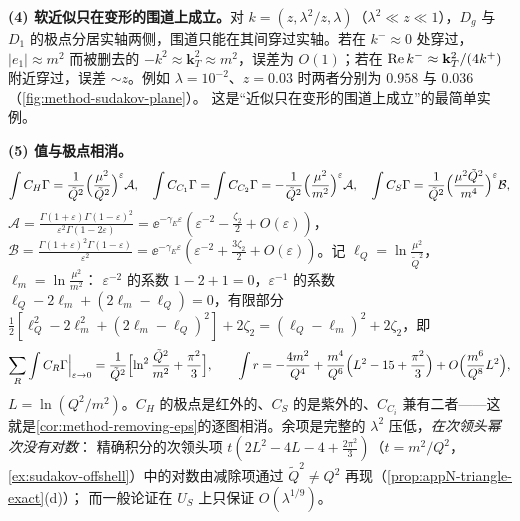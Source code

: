 \begin{example}
\textbf{(4) 软近似只在变形的围道上成立。}对 $k=(z,\lambda^2/z,\lambda)$（$\lambda^2\ll z\ll1$），$D_g$ 与 $D_1$ 的极点分居实轴两侧，围道只能在其间穿过实轴。若在 $k^-\approx0$ 处穿过，$|e_1|\approx m^2$
而被删去的 $-k^2\approx\mathbf k_T^2\approx m^2$，误差为 $O(1)$；若在 $\operatorname{Re} k^-\approx\mathbf k_T^2/(4k^+)$ 附近穿过，误差 $\sim z$。例如 $\lambda=10^{-2}$、$z=0.03$ 时两者分别为 $0.958$ 与 $0.036$
（\cref{fig:method-sudakov-plane}）。%
这是“近似只在变形的围道上成立”的最简单实例。

\textbf{(5) 值与极点相消。}
\begin{equation}\label{eq:method-tri-values}
\int C_H\Gamma=\frac{1}{\tilde Q^2}\Bigl(\frac{\mu^2}{\tilde Q^2}\Bigr)^{\varepsilon}\mathcal A,\quad
\int C_{C_1}\Gamma=\int C_{C_2}\Gamma=-\frac{1}{\tilde Q^2}\Bigl(\frac{\mu^2}{m^2}\Bigr)^{\varepsilon}\mathcal A,\quad
\int C_S\Gamma=\frac{1}{\tilde Q^2}\Bigl(\frac{\mu^2\tilde Q^2}{m^4}\Bigr)^{\varepsilon}\mathcal B,
\end{equation}
$\mathcal A=\frac{\Gamma(1+\varepsilon)\Gamma(1-\varepsilon)^2}{\varepsilon^2\Gamma(1-2\varepsilon)}=\ee^{-\gamma_E\varepsilon}(\varepsilon^{-2}-\frac{\zeta_2}2+O(\varepsilon))$，
$\mathcal B=\frac{\Gamma(1+\varepsilon)^2\Gamma(1-\varepsilon)}{\varepsilon^2}=\ee^{-\gamma_E\varepsilon}(\varepsilon^{-2}+\frac{3\zeta_2}2+O(\varepsilon))$。记 $\ell_Q=\ln\frac{\mu^2}{\tilde Q^2}$，$\ell_m=\ln\frac{\mu^2}{m^2}$：
$\varepsilon^{-2}$ 的系数 $1-2+1=0$，$\varepsilon^{-1}$ 的系数 $\ell_Q-2\ell_m+(2\ell_m-\ell_Q)=0$，有限部分 $\frac12[\ell_Q^2-2\ell_m^2+(2\ell_m-\ell_Q)^2]+2\zeta_2=(\ell_Q-\ell_m)^2+2\zeta_2$，即
\begin{equation}\label{eq:method-tri-sum}
\sum_R\int C_R\Gamma\Big|_{\varepsilon\to0}=\frac1{\tilde Q^2}\Bigl[\ln^2\frac{\tilde Q^2}{m^2}+\frac{\pi^2}3\Bigr],\qquad
\int r=-\frac{4m^2}{Q^4}+\frac{m^4}{Q^6}\Bigl(L^2-15+\frac{\pi^2}3\Bigr)+O\Bigl(\frac{m^6}{Q^8}L^2\Bigr),
\end{equation}
$L=\ln(Q^2/m^2)$。$C_H$ 的极点是红外的、$C_S$ 的是紫外的、$C_{C_i}$ 兼有二者——这就是\cref{cor:method-removing-eps}的逐图相消。余项是完整的 $\lambda^2$ 压低，\emph{在次领头幂次没有对数}：
精确积分的次领头项 $t(2L^2-4L-4+\frac{2\pi^2}3)$（$t=m^2/Q^2$，\cref{ex:sudakov-offshell}）中的对数由减除项通过 $\tilde Q^2\ne Q^2$ 再现（\cref{prop:appN-triangle-exact}(d)）；
而一般论证在 $U_S$ 上只保证 $O(\lambda^{1/9})$。


\end{example}
